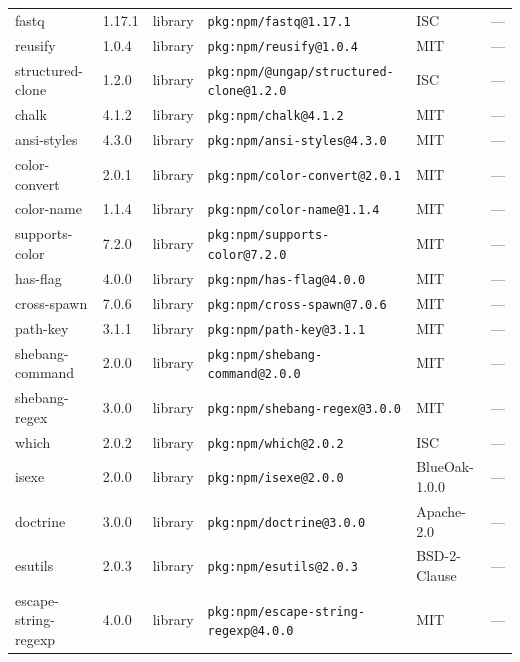 \documentclass[11pt,a4paper]{article}
\begin{document}
\begin{longtable}{|p{4cm}|p{2cm}|p{1.6cm}|p{5cm}|p{1.5cm}|p{3.5cm}|}
\raggedright fastq & 1.17.1 & library & \small\texttt{pkg:npm/fastq@1.17.1} & ISC & \small — \\
\raggedright reusify & 1.0.4 & library & \small\texttt{pkg:npm/reusify@1.0.4} & MIT & \small — \\
\raggedright structured-clone & 1.2.0 & library & \small\texttt{pkg:npm/@ungap/structured-clone@1.2.0} & ISC & \small — \\
\raggedright chalk & 4.1.2 & library & \small\texttt{pkg:npm/chalk@4.1.2} & MIT & \small — \\
\raggedright ansi-styles & 4.3.0 & library & \small\texttt{pkg:npm/ansi-styles@4.3.0} & MIT & \small — \\
\raggedright color-convert & 2.0.1 & library & \small\texttt{pkg:npm/color-convert@2.0.1} & MIT & \small — \\
\raggedright color-name & 1.1.4 & library & \small\texttt{pkg:npm/color-name@1.1.4} & MIT & \small — \\
\raggedright supports-color & 7.2.0 & library & \small\texttt{pkg:npm/supports-color@7.2.0} & MIT & \small — \\
\raggedright has-flag & 4.0.0 & library & \small\texttt{pkg:npm/has-flag@4.0.0} & MIT & \small — \\
\raggedright cross-spawn & 7.0.6 & library & \small\texttt{pkg:npm/cross-spawn@7.0.6} & MIT & \small — \\
\raggedright path-key & 3.1.1 & library & \small\texttt{pkg:npm/path-key@3.1.1} & MIT & \small — \\
\raggedright shebang-command & 2.0.0 & library & \small\texttt{pkg:npm/shebang-command@2.0.0} & MIT & \small — \\
\raggedright shebang-regex & 3.0.0 & library & \small\texttt{pkg:npm/shebang-regex@3.0.0} & MIT & \small — \\
\raggedright which & 2.0.2 & library & \small\texttt{pkg:npm/which@2.0.2} & ISC & \small — \\
\raggedright isexe & 2.0.0 & library & \small\texttt{pkg:npm/isexe@2.0.0} & BlueOak-1.0.0 & \small — \\
\raggedright doctrine & 3.0.0 & library & \small\texttt{pkg:npm/doctrine@3.0.0} & Apache-2.0 & \small — \\
\raggedright esutils & 2.0.3 & library & \small\texttt{pkg:npm/esutils@2.0.3} & BSD-2-Clause & \small — \\
\raggedright escape-string-regexp & 4.0.0 & library & \small\texttt{pkg:npm/escape-string-regexp@4.0.0} & MIT & \small — \\

\end{longtable}
\end{document}
